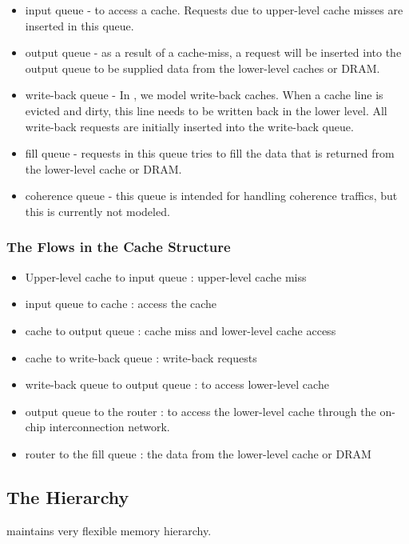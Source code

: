 \begin{itemize}
  \item input queue - to access a cache. Requests due to upper-level
  cache misses are inserted in this queue.

  \item output queue - as a result of a cache-miss, a request will be
  inserted into the output queue to be supplied data from the
  lower-level caches or DRAM.

  \item write-back queue - In \SIM, we model write-back caches. When a
  cache line is evicted and dirty, this line needs to be written back
  in the lower level. All write-back requests are initially inserted
  into the write-back queue.

  \item fill queue - requests in this queue tries to fill the data
  that is returned from the lower-level cache or DRAM.

  \item coherence queue - this queue is intended for handling
  coherence traffics, but this is currently not modeled.
\end{itemize}


\subsubsection{The Flows in the Cache Structure}
\label{sec:cache-flow}

\begin{itemize}

  \item Upper-level cache to input queue : upper-level cache miss

  \item input queue to cache : access the cache

  \item cache to output queue : cache miss and lower-level cache access

  \item cache to write-back queue : write-back requests

  \item write-back queue to output queue : to access lower-level cache

  \item output queue to the router : to access the lower-level cache
  through the on-chip interconnection network.

  \item router to the fill queue : the data from the lower-level cache
  or DRAM

\end{itemize}


\subsection{The Hierarchy}

\SIM maintains very flexible memory hierarchy.



